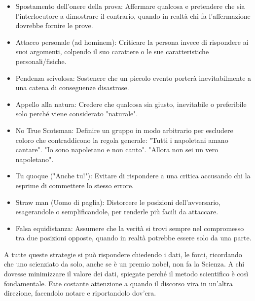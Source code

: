 \documentclass[12pt]{book} %
\begin{document}
\begin{itemize}
\item Spostamento dell’onere della prova: Affermare qualcosa e pretendere che sia l'interlocutore a dimostrare il contrario, quando in realtà chi fa l'affermazione dovrebbe fornire le prove.
\item Attacco personale (ad hominem): Criticare la persona invece di rispondere ai suoi argomenti, colpendo il suo carattere o le sue caratteristiche personali/fisiche.
\item Pendenza scivolosa: Sostenere che un piccolo evento porterà inevitabilmente a una catena di conseguenze disastrose.
\item Appello alla natura: Credere che qualcosa sia giusto, inevitabile o preferibile solo perché viene considerato "naturale".
\item No True Scotsman: Definire un gruppo in modo arbitrario per escludere coloro che contraddicono la regola generale: "Tutti i napoletani amano cantare". "Io sono napoletano e non canto". "Allora non sei un vero napoletano".
\item Tu quoque ("Anche tu!"): Evitare di rispondere a una critica accusando chi la esprime di commettere lo stesso errore.
\item Straw man (Uomo di paglia): Distorcere le posizioni dell’avversario, esagerandole o semplificandole, per renderle più facili da attaccare.
\item Falsa equidistanza: Assumere che la verità si trovi sempre nel compromesso tra due posizioni opposte, quando in realtà potrebbe essere solo da una parte.
\end{itemize}

A tutte queste strategie si può rispondere chiedendo i dati, le fonti, ricordando che uno scienziato da solo, anche se è un premio nobel, non fa la Scienza. A chi dovesse minimizzare il valore dei dati, spiegate perché il metodo scientifico è così fondamentale. Fate costante attenzione a quando il discorso vira in un'altra direzione, facendolo notare e riportandolo dov'era.
\end{document}

